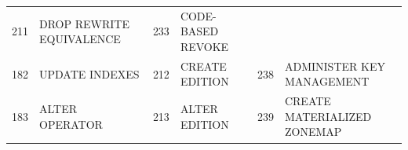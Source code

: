 \begin{appendix}
\begin{longtable}[]{@{}rl|rl|rl@{}}
\begin{minipage}[t]{0.06\columnwidth}
211\strut
\end{minipage} & \begin{minipage}[t]{0.24\columnwidth}\raggedright\strut
DROP REWRITE EQUIVALENCE\strut
\end{minipage} & \begin{minipage}[t]{0.06\columnwidth}\raggedright\strut
233\strut
\end{minipage} & \begin{minipage}[t]{0.24\columnwidth}\raggedright\strut
CODE-BASED REVOKE\strut
\end{minipage}\tabularnewline
\begin{minipage}[t]{0.06\columnwidth}\raggedright\strut
182\strut
\end{minipage} & \begin{minipage}[t]{0.19\columnwidth}\raggedright\strut
UPDATE INDEXES\strut
\end{minipage} & \begin{minipage}[t]{0.06\columnwidth}\raggedright\strut
212\strut
\end{minipage} & \begin{minipage}[t]{0.24\columnwidth}\raggedright\strut
CREATE EDITION\strut
\end{minipage} & \begin{minipage}[t]{0.06\columnwidth}\raggedright\strut
238\strut
\end{minipage} & \begin{minipage}[t]{0.24\columnwidth}\raggedright\strut
ADMINISTER KEY MANAGEMENT\strut
\end{minipage}\tabularnewline
\begin{minipage}[t]{0.06\columnwidth}\raggedright\strut
183\strut
\end{minipage} & \begin{minipage}[t]{0.19\columnwidth}\raggedright\strut
ALTER OPERATOR\strut
\end{minipage} & \begin{minipage}[t]{0.06\columnwidth}\raggedright\strut
213\strut
\end{minipage} & \begin{minipage}[t]{0.24\columnwidth}\raggedright\strut
ALTER EDITION\strut
\end{minipage} & \begin{minipage}[t]{0.06\columnwidth}\raggedright\strut
239\strut
\end{minipage} & \begin{minipage}[t]{0.24\columnwidth}\raggedright\strut
CREATE MATERIALIZED ZONEMAP\strut

\end{minipage}
\end{longtable}
\end{appendix}
